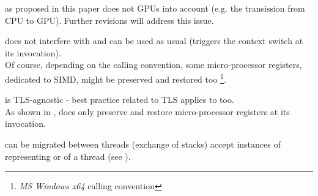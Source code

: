 

\cc as proposed in this paper does not GPUs into account (e.g. the transission
from CPU to GPU). Further revisions will address this issue.



does not interfere with \cc and can be used as usual (\cc triggers the context
switch at its invocation).\\
Of course, depending on the calling convention, some micro-processor registers,
dedicated to SIMD, might be preserved and restored too
\footnote{\emph{MS Windows x64} calling convention}.



\cc is TLS-agnostic - best practice related to TLS applies to \cc too.\\
As shown in , \cc does only  preserve and restore
micro-processor registers at its invocation.



\cont can be migrated between threads (exchange of stacks) accept instances of
\cont representing \main or \entryfn of a thread (see ).
